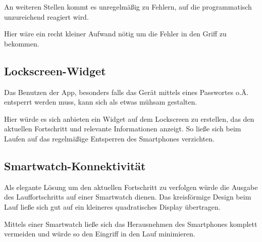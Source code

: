 An weiteren Stellen kommt es unregelmäßig zu Fehlern, auf die programmatisch unzureichend reagiert wird.

Hier wäre ein recht kleiner Aufwand nötig um die Fehler in den Griff zu bekommen.

\subsection{Lockscreen-Widget}
Das Benutzen der App, besonders falls das Gerät mittels eines Passwortes o.Ä. entsperrt werden muss, kann sich als etwas mühsam gestalten.

Hier würde es sich anbieten ein Widget auf dem Lockscreen zu erstellen, das den aktuellen Fortschritt und relevante Informationen anzeigt. So ließe sich beim Laufen auf das regelmäßige Entsperren des Smartphones verzichten.

\subsection{Smartwatch-Konnektivität}
Als elegante Lösung um den aktuellen Fortschritt zu verfolgen würde die Ausgabe des Lauffortschritts auf einer Smartwatch dienen. Das kreisförmige Design beim Lauf ließe sich gut auf ein kleineres quadratisches Display übertragen.

Mittels einer Smartwatch ließe sich das Herausnehmen des Smartphones komplett vermeiden und würde so den Eingriff in den Lauf minimieren.